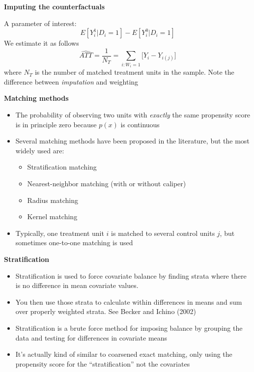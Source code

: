 \documentclass[notes=show]{beamer}
\begin{document}
\begin{frame}[plain]

	\begin{center}
	\textbf{Imputing the counterfactuals}
	\end{center}
	
	A parameter of interest: $$E[Y^1_i | D_i=1] - E[Y^0_i | D_i=1]$$We estimate it as follows  $$\widehat{ATT} = \frac{1}{N_T} = \sum_{i:W_i=1} \bigg [Y_i - Y_{i(j)} \bigg ]$$where $N_T$ is the number of matched treatment units in the sample. Note the difference between \emph{imputation} and weighting

\end{frame}

\begin{frame}[plain]
	\begin{center}
	\textbf{Matching methods}
	\end{center}
	
	\begin{itemize}
	\item The probability of observing two units with \emph{exactly} the same propensity score is in principle zero because $p(x)$ is continuous
	\item Several matching methods have been proposed in the literature, but the most widely used are:
		\begin{itemize}
		\item Stratification matching
		\item Nearest-neighbor matching (with or without caliper)
		\item Radius matching
		\item Kernel matching
		\end{itemize}
	\item Typically, one treatment unit $i$ is matched to several control units $j$, but sometimes one-to-one matching is used
	\end{itemize}
	
\end{frame}


\begin{frame}[plain]

	\begin{center}
	\textbf{Stratification}
	\end{center}
	
	\begin{itemize}
	\item Stratification is used to force covariate balance by finding strata where there is no difference in mean covariate values. 
	\item You then use those strata to calculate within differences in means and sum over properly weighted strata. See Becker and Ichino (2002)
	\item  Stratification is a brute force method for imposing balance by grouping the data and testing for differences in covariate means
	\item It's actually kind of similar to coarsened exact matching, only using the propensity score for the ``stratification'' not the covariates
	\end{itemize}
	
\end{frame}
\end{document}
